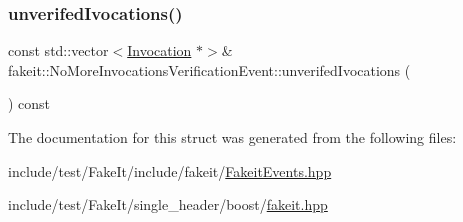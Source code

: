 \mbox{\label{structfakeit_1_1NoMoreInvocationsVerificationEvent_aaff3cb0916a4fe853f6f4e5fcc7f2632}} 
\subsubsection{\texorpdfstring{unverifedIvocations()}{unverifedIvocations()}\hspace{0.1cm}{\footnotesize\ttfamily [9/9]}}
{\footnotesize\ttfamily const std\+::vector$<$\mbox{\hyperlink{structfakeit_1_1Invocation}{Invocation}} $\ast$$>$\& fakeit\+::\+No\+More\+Invocations\+Verification\+Event\+::unverifed\+Ivocations (\begin{DoxyParamCaption}{ }\end{DoxyParamCaption}) const\hspace{0.3cm}{\ttfamily [inline]}}



The documentation for this struct was generated from the following files\+:\begin{DoxyCompactItemize}
\item 
include/test/\+Fake\+It/include/fakeit/\mbox{\hyperlink{FakeitEvents_8hpp}{Fakeit\+Events.\+hpp}}\item 
include/test/\+Fake\+It/single\+\_\+header/boost/\mbox{\hyperlink{single__header_2boost_2fakeit_8hpp}{fakeit.\+hpp}}\end{DoxyCompactItemize}
